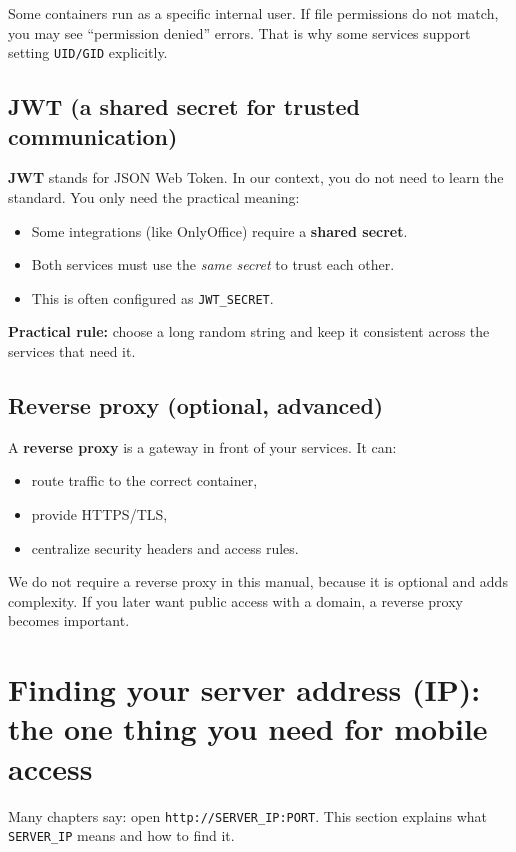 Some containers run as a specific internal user. If file permissions do not match, you may see ``permission denied'' errors.
That is why some services support setting \texttt{UID/GID} explicitly.

\subsection{JWT (a shared secret for trusted communication)}
\textbf{JWT} stands for JSON Web Token. In our context, you do not need to learn the standard.
You only need the practical meaning:

\begin{itemize}[leftmargin=*]
  \item Some integrations (like OnlyOffice) require a \textbf{shared secret}.
  \item Both services must use the \emph{same secret} to trust each other.
  \item This is often configured as \texttt{JWT\_SECRET}.
\end{itemize}

\textbf{Practical rule:} choose a long random string and keep it consistent across the services that need it.

\subsection{Reverse proxy (optional, advanced)}
A \textbf{reverse proxy} is a gateway in front of your services.
It can:
\begin{itemize}[leftmargin=*]
  \item route traffic to the correct container,
  \item provide HTTPS/TLS,
  \item centralize security headers and access rules.
\end{itemize}

We do not require a reverse proxy in this manual, because it is optional and adds complexity.
If you later want public access with a domain, a reverse proxy becomes important.

\section{Finding your server address (IP): the one thing you need for mobile access}
Many chapters say: open \texttt{http://SERVER\_IP:PORT}.
This section explains what \texttt{SERVER\_IP} means and how to find it.


